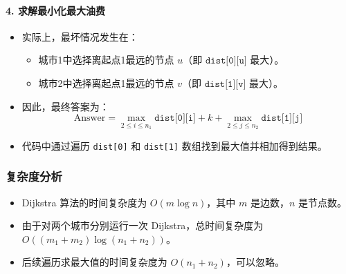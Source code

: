 \documentclass[../mainReport.tex]{subfiles}
\begin{document}
\paragraph{4. 求解最小化最大油费}
\begin{itemize}
    \item 实际上，最坏情况发生在：
        \begin{itemize}
            \item 城市1中选择离起点1最远的节点 $u$（即 $\texttt{dist[0][u]}$ 最大）。
            \item 城市2中选择离起点1最远的节点 $v$（即 $\texttt{dist[1][v]}$ 最大）。
        \end{itemize}
    \item 因此，最终答案为：
        $$
        \text{Answer} = \max_{2 \leq i \leq n_1} \texttt{dist[0][i]} + k + \max_{2 \leq j \leq n_2} \texttt{dist[1][j]}
        $$
    \item 代码中通过遍历 \texttt{dist[0]} 和 \texttt{dist[1]} 数组找到最大值并相加得到结果。
\end{itemize}

\subsubsection{复杂度分析}
\begin{itemize}
    \item Dijkstra 算法的时间复杂度为 $O(m \log n)$，其中 $m$ 是边数，$n$ 是节点数。
    \item 由于对两个城市分别运行一次 Dijkstra，总时间复杂度为 $O((m_1 + m_2) \log (n_1 + n_2))$。
    \item 后续遍历求最大值的时间复杂度为 $O(n_1 + n_2)$，可以忽略。
\end{itemize}




\end{document}
